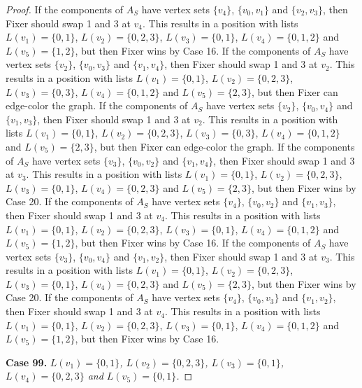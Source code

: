 \documentclass[12pt]{amsart}
\theoremstyle{plain}
\theoremstyle{definition}
\theoremstyle{remark}
\begin{document}
\begin{proof}
If the components of $A_S$ have vertex sets $\{v_4\}$, $\{v_0, v_1\}$ and $\{v_2, v_3\}$, then Fixer should swap 1 and 3 at $v_4$. This results in a position with lists $L(v_1) = \{0, 1\}$, $L(v_2) = \{0, 2, 3\}$, $L(v_3) = \{0, 1\}$, $L(v_4) = \{0, 1, 2\}$ and $L(v_5) = \{1, 2\}$, but then Fixer wins by Case 16.
If the components of $A_S$ have vertex sets $\{v_2\}$, $\{v_0, v_3\}$ and $\{v_1, v_4\}$, then Fixer should swap 1 and 3 at $v_2$. This results in a position with lists $L(v_1) = \{0, 1\}$, $L(v_2) = \{0, 2, 3\}$, $L(v_3) = \{0, 3\}$, $L(v_4) = \{0, 1, 2\}$ and $L(v_5) = \{2, 3\}$, but then Fixer can edge-color the graph.
If the components of $A_S$ have vertex sets $\{v_2\}$, $\{v_0, v_4\}$ and $\{v_1, v_3\}$, then Fixer should swap 1 and 3 at $v_2$. This results in a position with lists $L(v_1) = \{0, 1\}$, $L(v_2) = \{0, 2, 3\}$, $L(v_3) = \{0, 3\}$, $L(v_4) = \{0, 1, 2\}$ and $L(v_5) = \{2, 3\}$, but then Fixer can edge-color the graph.
If the components of $A_S$ have vertex sets $\{v_3\}$, $\{v_0, v_2\}$ and $\{v_1, v_4\}$, then Fixer should swap 1 and 3 at $v_3$. This results in a position with lists $L(v_1) = \{0, 1\}$, $L(v_2) = \{0, 2, 3\}$, $L(v_3) = \{0, 1\}$, $L(v_4) = \{0, 2, 3\}$ and $L(v_5) = \{2, 3\}$, but then Fixer wins by Case 20.
If the components of $A_S$ have vertex sets $\{v_4\}$, $\{v_0, v_2\}$ and $\{v_1, v_3\}$, then Fixer should swap 1 and 3 at $v_4$. This results in a position with lists $L(v_1) = \{0, 1\}$, $L(v_2) = \{0, 2, 3\}$, $L(v_3) = \{0, 1\}$, $L(v_4) = \{0, 1, 2\}$ and $L(v_5) = \{1, 2\}$, but then Fixer wins by Case 16.
If the components of $A_S$ have vertex sets $\{v_3\}$, $\{v_0, v_4\}$ and $\{v_1, v_2\}$, then Fixer should swap 1 and 3 at $v_3$. This results in a position with lists $L(v_1) = \{0, 1\}$, $L(v_2) = \{0, 2, 3\}$, $L(v_3) = \{0, 1\}$, $L(v_4) = \{0, 2, 3\}$ and $L(v_5) = \{2, 3\}$, but then Fixer wins by Case 20.
If the components of $A_S$ have vertex sets $\{v_4\}$, $\{v_0, v_3\}$ and $\{v_1, v_2\}$, then Fixer should swap 1 and 3 at $v_4$. This results in a position with lists $L(v_1) = \{0, 1\}$, $L(v_2) = \{0, 2, 3\}$, $L(v_3) = \{0, 1\}$, $L(v_4) = \{0, 1, 2\}$ and $L(v_5) = \{1, 2\}$, but then Fixer wins by Case 16.

\noindent\textbf{Case 99.  }\textit{$L(v_1) = \{0, 1\}$, $L(v_2) = \{0, 2, 3\}$, $L(v_3) = \{0, 1\}$, $L(v_4) = \{0, 2, 3\}$ and $L(v_5) = \{0, 1\}$.}


\end{proof}
\end{document}
